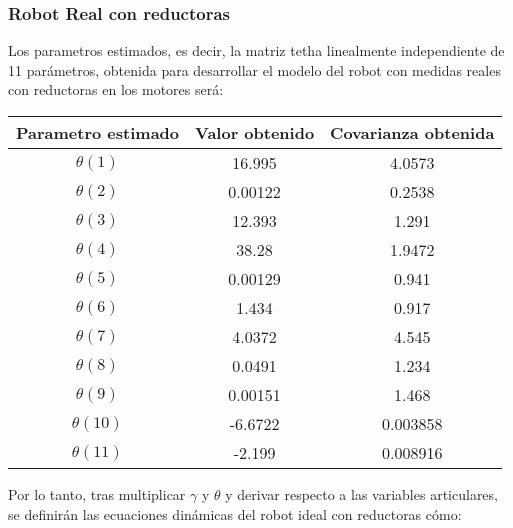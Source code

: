 \subsubsection{Robot Real con reductoras}
Los parametros estimados, es decir, la matriz tetha linealmente independiente de 11 parámetros, obtenida para desarrollar el modelo del robot con medidas reales con reductoras en los motores será:
\begin{center}
	\begin{tabular}{| c | c | c |}

		\hline
		Parametro estimado & Valor obtenido & Covarianza obtenida \\
		\hline
		$\theta(1) $ & 16.995 & 4.0573 \\
		\hline
		$\theta(2) $ & 0.00122 & 0.2538 \\
		\hline
		$\theta(3) $ & 12.393 & 1.291 \\
		\hline
		$\theta(4) $ & 38.28 & 1.9472 \\
		\hline
		$\theta(5) $ & 0.00129 & 0.941 \\
		\hline
		$\theta(6) $ & 1.434 & 0.917 \\
		\hline
		$\theta(7) $ & 4.0372 & 4.545 \\
		\hline
		$\theta(8) $ & 0.0491 & 1.234 \\
		\hline
		$\theta(9) $ & 0.00151 & 1.468 \\
		\hline
		$\theta(10) $ & -6.6722 & 0.003858 \\
		\hline
		$\theta(11) $ & -2.199 & 0.008916 \\
		\hline
	\end{tabular}
\end{center}
Por lo tanto, tras multiplicar $\gamma$ y $\theta$ y derivar respecto a las variables articulares, se definirán las ecuaciones dinámicas del robot ideal con reductoras cómo:
